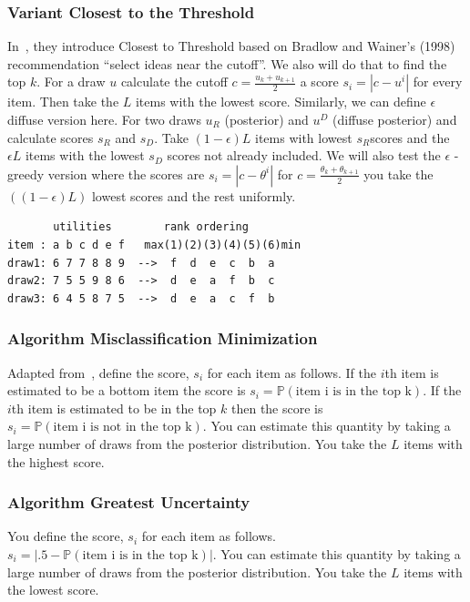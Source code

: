\documentclass[nonblindrev]{informs3}
\begin{document}
\subsubsection{Variant Closest to the Threshold}
In~\cite{toubia2007adaptive}, they introduce Closest to Threshold based on Bradlow and Wainer’s (1998) recommendation
``select ideas near the cutoff''. We also will do that to find the top $k$. For a draw $u$ calculate the cutoff $c=\frac{u_k+u_{k+1}}{2}$ a score $s_i=|c-u^i|$ for every item. Then take the $L$ items with the lowest score. Similarly, we can define $\epsilon$ diffuse version here. For two draws $u_R$ (posterior) and $u^D$ (diffuse posterior) and calculate scores $s_R$ and $s_D$. Take $(1- \epsilon)L$ items with lowest $s_R$scores and the $\epsilon L$ items with the lowest $s_D$ scores not already included. We will also test the $\epsilon$ - greedy version where the scores are $s_i=|c-\theta^i|$ for $c=\frac{\theta_k+\theta_{k+1}}{2}$ you take the $((1-\epsilon)L)$ lowest scores and the rest uniformly.

\begin{verbatim}
       utilities        rank ordering
item : a b c d e f   max(1)(2)(3)(4)(5)(6)min
draw1: 6 7 7 8 8 9  -->  f  d  e  c  b  a   
draw2: 7 5 5 9 8 6  -->  d  e  a  f  b  c 
draw3: 6 4 5 8 7 5  -->  d  e  a  c  f  b 
\end{verbatim}

\subsubsection{Algorithm Misclassification Minimization}
Adapted from~\cite{toubia2007adaptive}, define the score, $s_i$ for each item as follows. If the $i$th item is estimated to be a bottom item the score is $s_i=\mathbb{P}(\text{item i is in the top k})$. If the $i$th  item is estimated to be in the top $k$ then the score is $s_i=\mathbb{P}(\text{item i is not in the top k})$. You can estimate this quantity by taking a large number of draws from the posterior distribution. You take the $L$ items with the highest score.

\subsubsection{Algorithm Greatest Uncertainty}
You define the score, $s_i$ for each item as follows. $s_i=|.5-\mathbb{P}(\text{item i is in the top k})|$. You can estimate this quantity by taking a large number of draws from the posterior distribution. You take the $L$ items with the lowest score.
\end{document}
